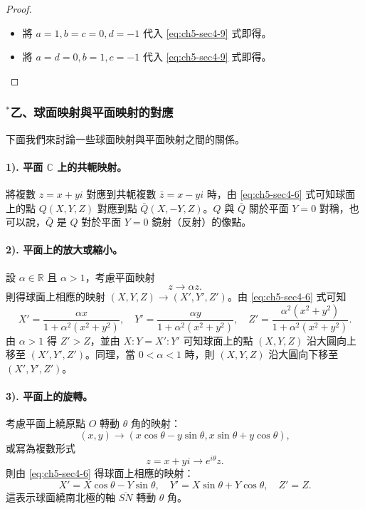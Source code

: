 \begin{proof}
\begin{itemize}
  \item[(i)] 將 $a=1, b=c=0, d=-1$ 代入 \eqref{eq:ch5-sec4-9} 式即得。
  \item[(ii)] 將 $a=d=0, b=1, c=-1$ 代入 \eqref{eq:ch5-sec4-9} 式即得。 \qedhere
\end{itemize}
\end{proof}

\subsubsection*{$^*$乙、球面映射與平面映射的對應}

下面我們來討論一些球面映射與平面映射之間的關係。

\paragraph{1). 平面 $\mathbb{C}$ 上的共軛映射。}
將複數 $z=x+yi$ 對應到共軛複數 $\bar{z}=x-yi$ 時，由 \eqref{eq:ch5-sec4-6} 式可知球面上的點 $Q(X, Y, Z)$ 對應到點 $\bar{Q}(X, -Y, Z)$。$Q$ 與 $\bar{Q}$ 關於平面 $Y=0$ 對稱，也可以說，$\bar{Q}$ 是 $Q$ 對於平面 $Y=0$ 鏡射（反射）的像點。

\paragraph{2). 平面上的放大或縮小。}
設 $\alpha \in \mathbb{R}$ 且 $\alpha > 1$，考慮平面映射
\[
z \longrightarrow \alpha z.
\]
則得球面上相應的映射 $(X, Y, Z) \longrightarrow (X', Y', Z')$。由 \eqref{eq:ch5-sec4-6} 式可知
\[
X' = \frac{\alpha x}{1+\alpha^2(x^2+y^2)}, \quad Y' = \frac{\alpha y}{1+\alpha^2(x^2+y^2)}, \quad Z' = \frac{\alpha^2(x^2+y^2)}{1+\alpha^2(x^2+y^2)}.
\]
由 $\alpha > 1$ 得 $Z' > Z$，並由 $X:Y = X':Y'$ 可知球面上的點 $(X, Y, Z)$ 沿大圓向上移至 $(X', Y', Z')$。同理，當 $0 < \alpha < 1$ 時，則 $(X, Y, Z)$ 沿大圓向下移至 $(X', Y', Z')$。

\paragraph{3). 平面上的旋轉。}
考慮平面上繞原點 $O$ 轉動 $\theta$ 角的映射：
\[
(x, y) \longrightarrow (x\cos\theta-y\sin\theta, x\sin\theta+y\cos\theta),
\]
或寫為複數形式
\[
z = x+yi \longrightarrow e^{i\theta} z.
\]
則由 \eqref{eq:ch5-sec4-6} 得球面上相應的映射：
\[
X' = X\cos\theta-Y\sin\theta, \quad Y' = X\sin\theta+Y\cos\theta, \quad Z' = Z.
\]
這表示球面繞南北極的軸 $\overline{SN}$ 轉動 $\theta$ 角。

